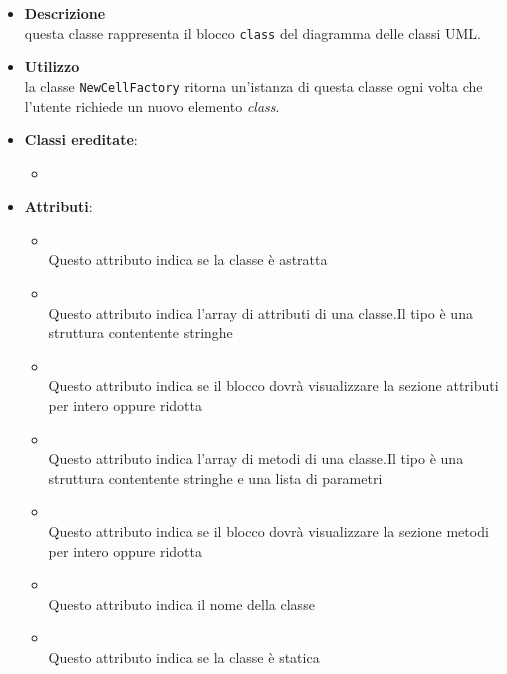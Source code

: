 \label{\nogloxy{swedesigner::client::model::celltypes::class::HxClass}}
\begin{itemize}
\item \textbf{Descrizione}\\
questa classe rappresenta il blocco \texttt{class} del diagramma delle classi UML.
\item \textbf{Utilizzo}\\
la classe \texttt{NewCellFactory} ritorna un'istanza di questa classe ogni volta che l'utente richiede un nuovo elemento \emph{class}.
\item \textbf{Classi ereditate}:
\begin{itemize}
\item \hyperref[\nogloxy{swedesigner::client::model::celltypes::class::ClassDiagramElement}]{}
\end{itemize}
\item \textbf{Attributi}:
\begin{itemize}
\item {}
\\ Questo attributo indica se la classe è astratta
\item {}
\\ Questo attributo indica l'array di attributi di una classe.Il tipo è una struttura contentente stringhe
\item {}
\\ Questo attributo indica se il blocco dovrà visualizzare la sezione attributi per intero oppure ridotta
\item {}
\\ Questo attributo indica l'array di metodi di una classe.Il tipo è una struttura contentente stringhe e una lista di parametri
\item {}
\\ Questo attributo indica se il blocco dovrà visualizzare la sezione metodi per intero oppure ridotta
\item {}
\\ Questo attributo indica il nome della classe
\item {}
\\ Questo attributo indica se la classe è statica
\end{itemize}

\end{itemize}
